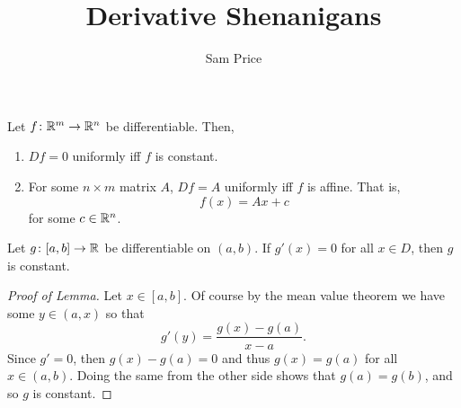 \documentclass{article}
\author{Sam Price}
\title{Derivative Shenanigans}
\begin{document}
\maketitle

\begin{proposition}{}{}
  Let $f \from \RR[m] \to \RR[n]$ be differentiable.
  Then,
  \begin{enumerate}[start=1,label={(\alph*)}]
    \item $Df = 0$ uniformly iff $f$ is constant.
    \item For some $n \times m$ matrix $A$, $Df = A$ uniformly iff $f$ is affine. That is,
          \[ f(x) = Ax + c \]
          for some $c \in \RR[n]$.
  \end{enumerate}
\end{proposition}

\begin{lemma}{}{}
  Let $g \from [a, b] \to \RR$ be differentiable on $(a, b)$.
  If $g'(x) = 0$ for all $x \in D$, then $g$ is constant.
\end{lemma}
\begin{proof}[Proof of Lemma]
  Let $x \in [a, b]$. Of course by the mean value theorem we have some $y \in (a, x)$ so that
  \[ g'(y) = \frac{g(x) - g(a)}{x - a}. \]
  Since $g' = 0$, then $g(x) - g(a) = 0$ and thus $g(x) = g(a)$ for all $x \in (a, b)$.
  Doing the same from the other side shows that $g(a) = g(b)$, and so $g$ is constant.
\end{proof}
\end{document}
